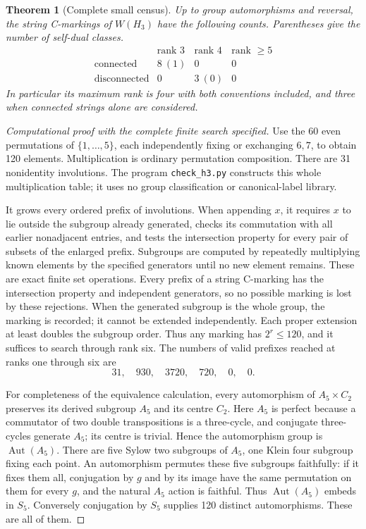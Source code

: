\documentclass[11pt,a4paper]{article}
\newtheorem{theorem}{Theorem}
\begin{document}
\begin{theorem}[Complete small census]
Up to group automorphisms and reversal, the string C-markings of $W(H_3)$
have the following counts. Parentheses give the number of self-dual classes.
\[
\begin{array}{c|ccc}
 &\text{rank }3&\text{rank }4&\text{rank }\ge5\\\hline
\text{connected}&8\ (1)&0&0\\
\text{disconnected}&0&3\ (0)&0
\end{array}
\]
In particular its maximum rank is four with both conventions included,
and three when connected strings alone are considered.
\end{theorem}
\begin{proof}[Computational proof with the complete finite search specified]
Use the 60 even permutations of $\{1,\ldots,5\}$, each independently
fixing or exchanging $6,7$, to obtain 120 elements. Multiplication is ordinary
permutation composition. There are 31 nonidentity involutions.
The program \texttt{check\_h3.py} constructs this whole multiplication table;
it uses no group classification or canonical-label library.

It grows every ordered prefix of involutions. When appending $x$, it requires
$x$ to lie outside the subgroup already generated, checks its commutation
with all earlier nonadjacent entries, and tests the intersection property
for every pair of subsets of the enlarged prefix. Subgroups are computed
by repeatedly multiplying known elements by the specified generators until
no new element remains. These are exact finite set operations.
Every prefix of a string C-marking has the intersection property and
independent generators, so no possible marking is lost by these rejections.
When the generated subgroup is the whole group, the marking is recorded;
it cannot be extended independently. Each proper extension at least doubles
the subgroup order. Thus any marking has $2^r\le120$, and it suffices to
search through rank six. The numbers of valid prefixes reached at ranks
one through six are
\[
                  31,\quad930,\quad3720,\quad720,\quad0,\quad0.
\]

For completeness of the equivalence calculation, every automorphism of
$A_5\times C_2$ preserves its derived subgroup $A_5$ and its centre $C_2$.
Here $A_5$ is perfect because a commutator of two double transpositions is
a three-cycle, and conjugate three-cycles generate $A_5$; its centre is
trivial. Hence the automorphism group is $\operatorname{Aut}(A_5)$.
There are five Sylow two subgroups of $A_5$, one Klein four subgroup fixing
each point. An automorphism permutes these five subgroups faithfully:
if it fixes them all, conjugation by $g$ and by its image have the same
permutation on them for every $g$, and the natural $A_5$ action is faithful.
Thus $\operatorname{Aut}(A_5)$ embeds in $S_5$. Conversely conjugation
by $S_5$ supplies 120 distinct automorphisms. These are all of them.


\end{proof}
\end{document}
